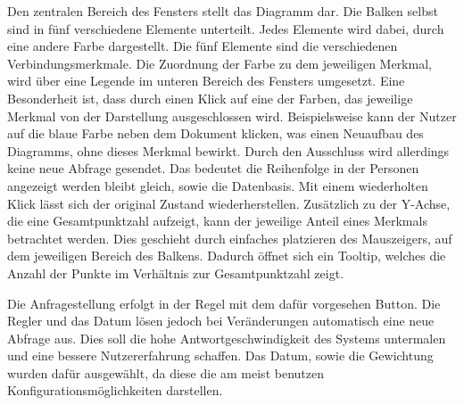 Den zentralen Bereich des Fensters stellt das Diagramm dar. Die Balken selbst sind in fünf verschiedene Elemente unterteilt. Jedes Elemente wird dabei, durch eine andere Farbe dargestellt. Die fünf Elemente sind die verschiedenen Verbindungsmerkmale. Die Zuordnung der Farbe zu dem jeweiligen Merkmal, wird über eine Legende im unteren Bereich des Fensters umgesetzt. Eine Besonderheit ist, dass durch einen Klick auf eine der Farben, das jeweilige Merkmal von der Darstellung ausgeschlossen wird. Beispielsweise kann der Nutzer auf die blaue Farbe neben dem Dokument klicken, was einen Neuaufbau des Diagramms, ohne dieses Merkmal bewirkt. Durch den Ausschluss wird allerdings keine neue Abfrage gesendet. Das  bedeutet die Reihenfolge in der Personen angezeigt werden bleibt gleich, sowie die Datenbasis. Mit einem wiederholten Klick lässt sich der original Zustand wiederherstellen. Zusätzlich zu der Y-Achse, die eine Gesamtpunktzahl aufzeigt, kann der jeweilige Anteil eines Merkmals betrachtet werden. Dies geschieht durch einfaches platzieren des Mauszeigers, auf dem jeweiligen Bereich des Balkens. Dadurch öffnet sich ein Tooltip, welches die Anzahl der Punkte im Verhältnis zur Gesamtpunktzahl zeigt.

Die Anfragestellung erfolgt in der Regel mit dem dafür vorgesehen Button. Die Regler und das Datum lösen jedoch bei Veränderungen automatisch eine neue Abfrage aus. Dies soll die hohe Antwortgeschwindigkeit des Systems untermalen und eine bessere Nutzererfahrung schaffen. Das Datum, sowie die Gewichtung wurden dafür ausgewählt, da diese die am meist benutzen Konfigurationsmöglichkeiten darstellen.
